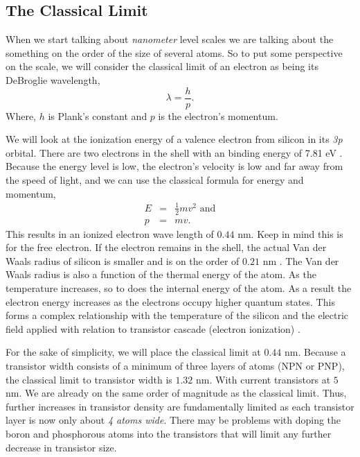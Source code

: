 \documentclass[runningheads]{llncs}
\begin{document}
\subsection{The Classical Limit}
When we start talking about \emph{nanometer} level scales we are talking about the something on the order of the size of several atoms.
So to put some perspective on the scale, we will consider the classical limit of an electron as being its DeBroglie wavelength,
\begin{equation}
    \lambda = \frac{h}{p}.
\end{equation}
Where, $h$ is Plank's constant and $p$ is the electron's momentum.

We will look at the ionization energy of a valence electron from silicon in its \emph{3p} orbital.
There are two electrons in the shell with an binding energy of 7.81 eV \cite{shattuck2017ionization}.
Because the energy level is low, the electron's velocity is low and far away from the speed of light, and we can use the classical formula for energy and momentum,
\begin{eqnarray}
    E &=& \frac{1}{2} m v^2 \mbox{ and} \\
    p &=& mv.
\end{eqnarray}
This results in an ionized electron wave length of $0.44$ nm.
Keep in mind this is for the free electron.
If the electron remains in the shell, the actual Van der Waals radius of silicon is smaller and is on the order of $0.21$ nm \cite{VdW-Si}.
The Van der Waals radius is also a function of the thermal energy of the atom.
As the temperature increases, so to does the internal energy of the atom.
As a result the electron energy increases as the electrons occupy higher quantum states.
This forms a complex relationship with the temperature of the silicon and the electric field applied with relation to transistor cascade (electron ionization) \cite{maes1990impact}.

For the sake of simplicity, we will place the classical limit at $0.44$ nm.
Because a transistor width consists of a minimum of three layers of atoms (NPN or PNP), the classical limit to transistor width is $1.32$ nm.
With current transistors at $5$ nm. We are already on the same order of magnitude as the classical limit.
Thus, further increases in transistor density are fundamentally limited as each transistor layer is now only about \emph{4 atoms wide}.
There may be problems with doping the boron and phosphorous atoms into the transistors that will limit any further decrease in transistor size.
\end{document}
